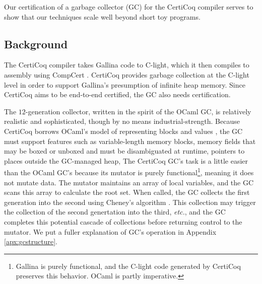Our certification of a garbage collector (GC) for the 
CertiCoq compiler serves to show that our techniques 
scale well beyond short toy programs. 


\subsection{Background}
\label{sec:gcbackground}

The CertiCoq compiler \cite{certicoqwebsite} takes Gallina code to 
C-light, which it then compiles to assembly using CompCert \cite{leroy:compcert}.
CertiCoq provides garbage collection at
the C-light level in order to support Gallina's presumption of
infinite heap memory. 
Since CertiCoq aims to be end-to-end certified, the GC 
also needs certification.

The $12$-generation collector, written in the spirit of the OCaml GC, 
is relatively realistic and sophisticated, though by no means 
industrial-strength. 
Because CertiCoq borrows OCaml's model of representing blocks and 
values \cite{realworldocaml}, the GC must support features such as 
variable-length memory blocks, memory fields that may be boxed 
or unboxed and must be disambiguated at runtime, pointers to places 
outside the GC-managed heap, 
The CertiCoq GC's task is a little easier than the OCaml GC's because 
its mutator is purely functional\footnote{Gallina is purely functional, and
the C-light code generated by CertiCoq preserves this behavior.
OCaml is partly imperative.},
meaning it does not mutate data. The mutator maintains an array of 
local variables, and the GC scans this array to 
calculate the root set. When called, the GC collects the first generation 
into the second using Cheney's algorithm \cite{cheney:gc}.
This collection may trigger the collection of the second genertation 
into the third, \emph{etc.}, and the GC completes this potential cascade 
of collections before returning control to the mutator. We put a 
fuller explanation of GC's operation in Appendix \ref{apx:gcstructure}.

